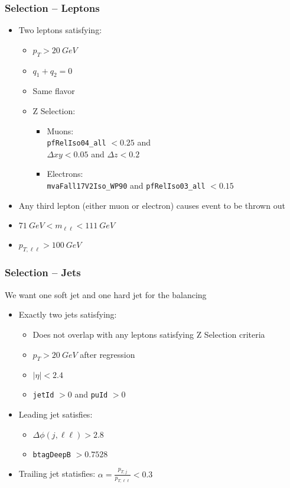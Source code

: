 \documentclass{beamer}
\begin{document}
\begin{frame}
  \frametitle{Selection -- Leptons}

  \begin{itemize}
  \item Two leptons satisfying:
    \begin{itemize}
    \item $p_T > \SI{20}{GeV}$
    \item $q_1 + q_2 = 0$
    \item Same flavor
    \item Z Selection:
      \begin{itemize}
      \item Muons: \\
        \texttt{pfRelIso04\_all} $< 0.25$ and \\
        $\Delta xy < 0.05$ and $\Delta z < 0.2$
      \item Electrons: \\
        \texttt{mvaFall17V2Iso\_WP90} and \texttt{pfRelIso03\_all} $< 0.15$
      \end{itemize}
    \end{itemize}
  \item Any third lepton (either muon or electron) causes event to be thrown out
  \item $\SI{71}{GeV} < m_{\ell\ell} < \SI{111}{GeV}$
  \item $p_{T,\ell\ell} > \SI{100}{GeV}$
  \end{itemize}

\end{frame}


\begin{frame}
  \frametitle{Selection -- Jets}

  We want one soft jet and one hard jet for the balancing

  \begin{itemize}
  \item Exactly two jets satisfying:
    \begin{itemize}
    \item Does not overlap with any leptons satisfying Z Selection criteria
    \item $p_T > \SI{20}{GeV}$ after regression
    \item $|\eta| < 2.4$
    \item \texttt{jetId} $> 0$ and \texttt{puId} $> 0$
    \end{itemize}
  \item Leading jet satisfies:
    \begin{itemize}
    \item $\Delta\phi(j, \ell\ell) > 2.8$
    \item \texttt{btagDeepB} $> 0.7528$
    \end{itemize}
  \item Trailing jet statisfies: $\alpha = \frac{p_{T, j}}{p_{T, \ell\ell}} < 0.3$
  \end{itemize}

\end{frame}
\end{document}
